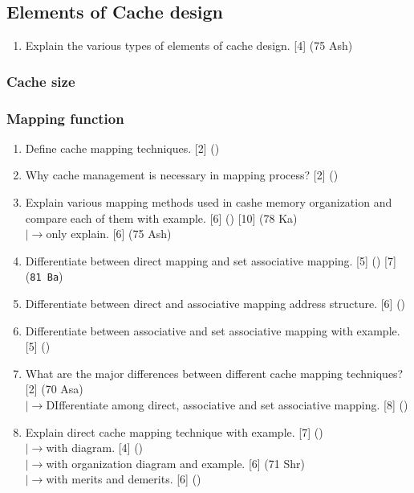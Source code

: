 \documentclass[12pt]{article}
\newcommand{\lb}{\\$\left|\rightarrow\right.$}
\begin{document}
	\subsection{Elements of Cache design}
		\begin{enumerate}
			\item Explain the various types of elements of cache design. \hfill [4] (75 Ash)
		\end{enumerate}

	\subsubsection{Cache size}
	\subsubsection{Mapping function}
		\begin{enumerate}
			\item Define cache mapping techniques. \hfill [2] ()

			\item Why cache management is necessary in mapping process? \hfill [2] ()

			\item Explain various mapping methods used in cashe memory organization and compare each of them with example. \hfill [6] () [10] (78 Ka)
			\lb only explain. \hfill [6] (75 Ash)

			\item Differentiate between direct mapping and set associative mapping. \hfill [5] () [7] (\texttt{81 Ba})

			\item Differentiate between direct and associative mapping address structure. \hfill [6] ()

			\item Differentiate between associative and set associative mapping with example. \hfill [5] ()

			\item What are the major differences between different cache mapping techniques? \hfill [2] (70 Asa)
			\lb DIfferentiate among direct, associative and set associative mapping. \hfill [8] ()

			\item Explain direct cache mapping technique with example. \hfill [7] ()
			\lb with diagram. \hfill [4] ()
			\lb with organization diagram and example. \hfill [6] (71 Shr)
			\lb with merits and demerits. \hfill [6] ()


\end{enumerate}
\end{document}
